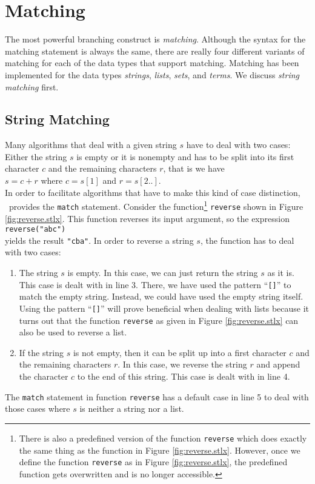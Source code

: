 \section{Matching}
The most powerful branching construct is \emph{matching}.  Although the syntax for the
matching statement is always the same, there are really four different variants of matching for each of the
data types that support matching.  Matching has been implemented for the data types
 \emph{strings}, \emph{lists}, \emph{sets}, and \emph{terms}.  We discuss \emph{string matching} first.

\subsection{String Matching}
Many algorithms that deal with a given string $s$ have to deal with two cases:  Either the string $s$ is
empty or it is nonempty and has to be split into its first character $c$ and the remaining characters $r$,
that is we have 
\\[0.2cm]
\hspace*{1.3cm}
$s = c + r$ \quad where $c = s[1]$ and $r = s[2..]$.
\\[0.2cm]
In order to facilitate algorithms that have to make this kind of case distinction, \setlx\ provides the
\texttt{match} statement.  Consider the function\footnote{
There is also a predefined version of the function \texttt{reverse} which does exactly the
same thing as the function in Figure \ref{fig:reverse.stlx}.  However, once we define the
function \texttt{reverse} as in Figure \ref{fig:reverse.stlx}, the predefined function
gets overwritten and is no longer accessible.}
 \texttt{reverse} shown in Figure \ref{fig:reverse.stlx}.
This function reverses its input argument, so the expression
\\[0.2cm]
\hspace*{1.3cm}
\texttt{reverse("abc")}
\\[0.2cm]
yields the result \texttt{"cba"}.  In order to reverse a string $s$, the function has to deal with two
cases:
\begin{enumerate}
\item The string $s$ is empty.  In this case, we can just return the string $s$ as it is.
      This case is dealt with in line 3.  There, we have used the pattern ``\texttt{[]}'' to match
      the empty string.  Instead, we could have used the empty string itself.  Using the pattern
      ``\texttt{[]}'' will prove beneficial when dealing with lists because it turns out that the
      function
      \texttt{reverse} as given in Figure \ref{fig:reverse.stlx} can also be used to reverse a list.
\item If the string $s$ is not empty, then it can be split up into a first character $c$ and the remaining
      characters $r$.  In this case, we reverse the string $r$ and append the character $c$ to the end of
      this string.  This case is dealt with in line 4.
\end{enumerate}
The \texttt{match} statement in function \texttt{reverse}  has a default case in line 5 to deal with
those cases where $s$ is neither a string nor a list. 

